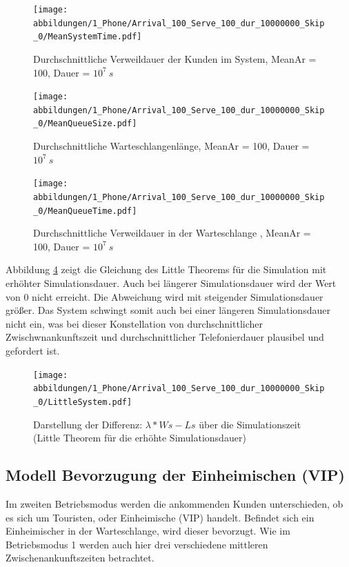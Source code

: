 \begin{figure}[htpb]
	\centering
	\texttt{[image: abbildungen/1\_Phone/Arrival\_100\_Serve\_100\_dur\_10000000\_Skip\_0/MeanSystemTime.pdf]}
	\caption{Durchschnittliche Verweildauer der Kunden im System, MeanAr = 100, Dauer = $10^7 \ s$}
	\label{fig:meanSystemTime100_duration_10000000}
\end{figure}



\begin{figure}[htpb]
	\centering
	\texttt{[image: abbildungen/1\_Phone/Arrival\_100\_Serve\_100\_dur\_10000000\_Skip\_0/MeanQueueSize.pdf]}
	\caption{Durchschnittliche Warteschlangenlänge, MeanAr = 100, Dauer = $10^7 \ s$}
	\label{fig:meanQueueSize100_duration_10000000}
\end{figure}


\begin{figure}[htpb]
	\centering
	\texttt{[image: abbildungen/1\_Phone/Arrival\_100\_Serve\_100\_dur\_10000000\_Skip\_0/MeanQueueTime.pdf]}
	\caption{Durchschnittliche Verweildauer in der Warteschlange , MeanAr = 100, Dauer = $10^7 \ s$}
	\label{fig:meanQueueTime100_duration_10000000}
\end{figure}

Abbildung \ref{fig:LittleSystem100_duration_10000000} zeigt die Gleichung des Little Theorems für die Simulation mit erhöhter Simulationsdauer. Auch bei längerer Simulationsdauer wird der Wert von $0$ nicht erreicht. Die Abweichung wird mit steigender Simulationsdauer größer. Das System schwingt somit auch bei einer längeren Simulationsdauer nicht ein, was bei dieser Konstellation von durchschnittlicher Zwischwnankunftszeit und durchschnittlicher Telefonierdauer plausibel und gefordert ist.

\begin{figure}[htpb]
	\centering
	\texttt{[image: abbildungen/1\_Phone/Arrival\_100\_Serve\_100\_dur\_10000000\_Skip\_0/LittleSystem.pdf]}
	\caption{Darstellung der Differenz: $\lambda * Ws - Ls$ über die Simulationszeit (Little Theorem für die erhöhte Simulationsdauer)}
	\label{fig:LittleSystem100_duration_10000000}
\end{figure}

\subsection{Modell \glqq Bevorzugung der Einheimischen (VIP)\grqq}
Im zweiten Betriebsmodus werden die ankommenden Kunden unterschieden, ob es sich um Touristen, oder Einheimische (VIP) handelt. Befindet sich ein Einheimischer in der Warteschlange, wird dieser bevorzugt. Wie im Betriebsmodus 1 werden auch hier drei verschiedene mittleren Zwischenankunftszeiten betrachtet.

